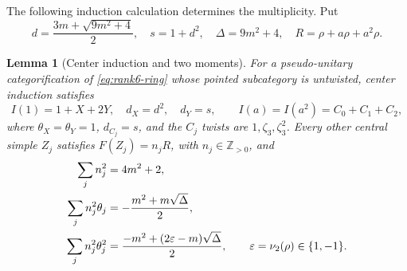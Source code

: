 \documentclass[11pt,a4paper]{article}
\newtheorem{lemma}[theorem]{Lemma}
\theoremstyle{definition}
\begin{document}
The following induction calculation determines the multiplicity.
Put
\[
 d=\frac{3m+\sqrt{9m^2+4}}2,\quad s=1+d^2,\quad
 \Delta=9m^2+4,\quad R=\rho+a\rho+a^2\rho.
\]
\begin{lemma}[Center induction and two moments]
\label{lem:rank6-induction}
For a pseudo-unitary categorification of \eqref{eq:rank6-ring} whose
pointed subcategory is untwisted, center induction satisfies
\[
 I(1)=1+X+2Y,\quad d_X=d^2,\quad d_Y=s,
 \qquad I(a)=I(a^2)=C_0+C_1+C_2,
\]
where $\theta_X=\theta_Y=1$, $d_{C_j}=s$, and the $C_j$ twists are
$1,\zeta_3,\zeta_3^2$. Every other central simple $Z_j$ satisfies
$F(Z_j)=n_jR$, with $n_j\in\mathbb Z_{>0}$, and
\begin{align}
 \sum_jn_j^2&=4m^2+2,\notag\\
 \sum_jn_j^2\theta_j&=-\frac{m^2+m\sqrt\Delta}{2},
 \label{eq:indicator-first}\\
 \sum_jn_j^2\theta_j^2
 &=\frac{-m^2+(2\varepsilon-m)\sqrt\Delta}{2},
 \qquad\varepsilon=\nu_2(\rho)\in\{1,-1\}.
 \label{eq:indicator-second}
\end{align}
\end{lemma}
\end{document}
